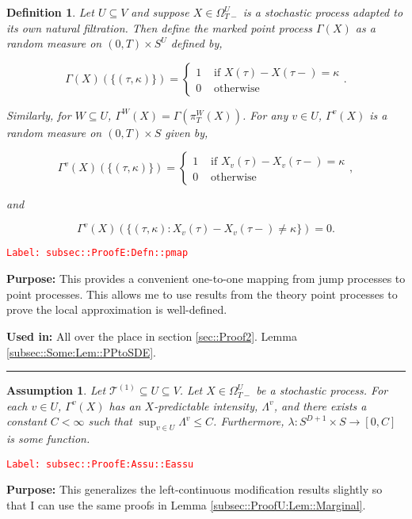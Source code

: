 \documentclass[12pt]{article}
\newcommand{\mc}{\mathcal}
\newcommand{\ra}{\rightarrow}
\newcommand{\te}{\text}
\newcommand{\tr}{\textcolor{red}}
\newcommand{\labe}[1]{\tr{\texttt{Label: #1}}}
\newcommand{\purpose}{\textbf{Purpose: }}
\newcommand{\usein}{\textbf{Used in: }}
\newcommand{\lin}{\rule{\linewidth}{0.4 pt}}
\renewcommand{\v}{v}							%
\renewcommand{\U}{U}							%
\newcommand{\UU}{W}								%
\renewcommand{\S}{S}							%
\newcommand{\T}{T}								%
\newcommand{\sset}{\Omega}						%
\newcommand{\proj}{\pi}							%
\newcommand{\X}{X}								%
\newcommand{\vind}[1]{^{#1}}					%
\newcommand{\carp}[1]{^{#1}}					%
\newcommand{\vsi}[1]{^{#1}}						%
\newcommand{\cind}[1]{_{#1}}					%
\newcommand{\tp}[1]{(#1)}						%
\newcommand{\ts}[1]{_{#1}}						%
\newcommand{\const}{C}							%
\newcommand{\degr}{D}							%
\newcommand{\tree}{\mc{T}}						%
\newcommand{\sln}[1]{^{(#1)}}					%
\newcommand{\rt}{\tau}							%
\newcommand{\pmap}{\Gamma}						%
\renewcommand{\mark}{\kappa}					%
\newcommand{\ratee}{\Lambda}					%
\newtheorem{defn}[thms]{Definition}
\newtheorem{assu}[thms]{Assumption}
\begin{document}
\begin{defn}
Let \(\U\subseteq V\) and suppose \(\X \in \sset\vsi{\U}\ts{\T-}\) is a stochastic process adapted to its own natural filtration. Then define the marked point process \(\pmap(\X)\) as a random measure on \((0,\T) \times \S\carp{\U}\) defined by,

\[\pmap(\X)(\{(\rt,\mark)\}) = \begin{cases}
1 &\te{ if } \X\tp{\rt} - \X\tp{\rt-} = \mark\\
0 &\te{ otherwise}
\end{cases}.\]

Similarly, for \(\UU \subseteq \U\), \(\pmap\vind{\UU}(\X) = \pmap\left(\proj\vsi{\UU}\ts{\T}(\X)\right)\). For any \(\v\in \U\), \(\pmap\vind{\v}(\X)\) is a random measure on \((0,\T) \times \S\) given by,

\[\pmap\vind{\v}(\X)(\{(\rt,\mark)\}) = \begin{cases}
1 &\te{ if } \X\cind{\v}\tp{\rt} - \X\cind{\v}\tp{\rt-} = \mark\\
0 &\te{ otherwise}
\end{cases},\]

and

\[\pmap\vind{\v}(\X)(\{(\rt,\mark): \X\cind{\v}\tp{\rt} - \X\cind{\v}\tp{\rt-} \neq \mark\}) = 0.\]
\label{subsec::ProofE:Defn::pmap}
\end{defn}
\labe{subsec::ProofE:Defn::pmap}

\purpose This provides a convenient one-to-one mapping from jump processes to point processes. This allows me to use results from the theory point processes to prove the local approximation is well-defined.

\usein All over the place in section \ref{sec::Proof2}. Lemma \ref{subsec::Some:Lem::PPtoSDE}.

\lin

\begin{assu}
Let \(\tree\sln{1}\subseteq\U \subseteq V\). Let \(\X\in \sset\vsi{\U}\ts{\T-}\) be a stochastic process. For each \(\v\in \U\), \(\pmap\vind{\v}(\X)\) has an \(\X\)-predictable intensity, \(\ratee\vind{\v}\), and there exists a constant \(\const < \infty\) such that \(\sup_{\v\in\U} \ratee\vind{\v} \leq \const\). Furthermore, \(\lambda: \S\carp{\degr+1}\times \S\ra[0,\const]\) is some function.
\label{subsec::ProofE:Assu::Eassu}
\end{assu}
\labe{subsec::ProofE:Assu::Eassu}

\purpose This generalizes the left-continuous modification results slightly so that I can use the same proofs in Lemma \ref{subsec::ProofU:Lem::Marginal}.
\end{document}
